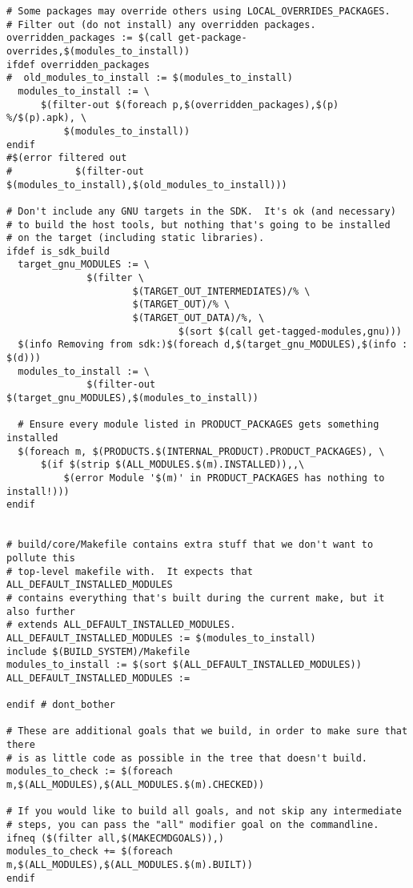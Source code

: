 \documentclass[12pt,a4paper]{article}
\begin{document}
\begin{verbatim}
# Some packages may override others using LOCAL_OVERRIDES_PACKAGES.
# Filter out (do not install) any overridden packages.
overridden_packages := $(call get-package-overrides,$(modules_to_install))
ifdef overridden_packages
#  old_modules_to_install := $(modules_to_install)
  modules_to_install := \
      $(filter-out $(foreach p,$(overridden_packages),$(p) %/$(p).apk), \
          $(modules_to_install))
endif
#$(error filtered out
#           $(filter-out $(modules_to_install),$(old_modules_to_install)))

# Don't include any GNU targets in the SDK.  It's ok (and necessary)
# to build the host tools, but nothing that's going to be installed
# on the target (including static libraries).
ifdef is_sdk_build
  target_gnu_MODULES := \
              $(filter \
                      $(TARGET_OUT_INTERMEDIATES)/% \
                      $(TARGET_OUT)/% \
                      $(TARGET_OUT_DATA)/%, \
                              $(sort $(call get-tagged-modules,gnu)))
  $(info Removing from sdk:)$(foreach d,$(target_gnu_MODULES),$(info : $(d)))
  modules_to_install := \
              $(filter-out $(target_gnu_MODULES),$(modules_to_install))

  # Ensure every module listed in PRODUCT_PACKAGES gets something installed
  $(foreach m, $(PRODUCTS.$(INTERNAL_PRODUCT).PRODUCT_PACKAGES), \
      $(if $(strip $(ALL_MODULES.$(m).INSTALLED)),,\
          $(error Module '$(m)' in PRODUCT_PACKAGES has nothing to install!)))
endif


# build/core/Makefile contains extra stuff that we don't want to pollute this
# top-level makefile with.  It expects that ALL_DEFAULT_INSTALLED_MODULES
# contains everything that's built during the current make, but it also further
# extends ALL_DEFAULT_INSTALLED_MODULES.
ALL_DEFAULT_INSTALLED_MODULES := $(modules_to_install)
include $(BUILD_SYSTEM)/Makefile
modules_to_install := $(sort $(ALL_DEFAULT_INSTALLED_MODULES))
ALL_DEFAULT_INSTALLED_MODULES :=

endif # dont_bother

# These are additional goals that we build, in order to make sure that there
# is as little code as possible in the tree that doesn't build.
modules_to_check := $(foreach m,$(ALL_MODULES),$(ALL_MODULES.$(m).CHECKED))

# If you would like to build all goals, and not skip any intermediate
# steps, you can pass the "all" modifier goal on the commandline.
ifneq ($(filter all,$(MAKECMDGOALS)),)
modules_to_check += $(foreach m,$(ALL_MODULES),$(ALL_MODULES.$(m).BUILT))
endif


\end{verbatim}
\end{document}
